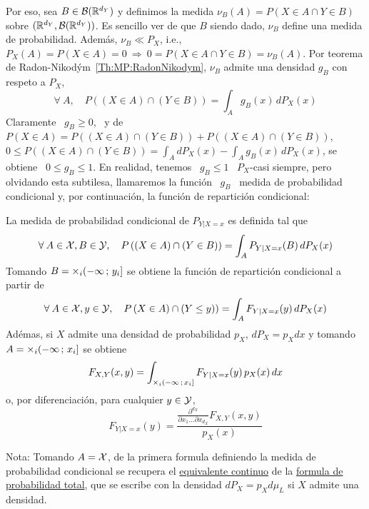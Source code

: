 {Por eso, sea $B \in \mathcal{B}(\mathbb{R}^{d_Y})$ y definimos la medida $\nu_B(A) = P(X \in A
\cap Y  \in B)$ sobre  $(\mathbb{R}^{d_Y},\mathcal{B}(\mathbb{R}^{d_Y}))$.  Es sencillo ver  de que
$B$ siendo dado, $\nu_B$ define una medida de probabilidad. Adem\'as, $\nu_B \ll
P_X$, i.e., $P_X(A) = P(X \in A) = 0  \: \Rightarrow \: 0 = P(X \in A \cap Y \in
B)  =  \nu_B(A)$.    Por  teorema  de  Radon-Nikod\'ym~\ref{Th:MP:RadonNikodym},
$\nu_B$ admite una densidad $g_B$ con respeto a $P_X$,
%
\[
\forall \: A, \quad P\left( (X \in A)  \cap (Y \in B) \right) = \int_A g_B(x) \,
dP_X(x)
\]
%
Claramente \ $g_B \ge 0$,  \ y de \ $P(X \in A) = P\left(  (X \in A) \cap (Y \in
  B) \right) + P\left(  (X \in A) \cap (Y \in B)  \right)$, \ie $\displaystyle 0
\le P\left( (X \in A) \cap (Y \in B) \right) = \int_A dP_X(x) - \int_A g_B(x) \,
dP_X(x)$, se obtiene \ $0 \le g_B \le  1$.  En realidad, tenemos \ $g_B \le 1$ \
$P_X$-casi  siempre, pero olvidando  esta subtilesa,  llamaremos la  funci\'on \
$g_B$ \ medida  de probabilidad condicional y, por  continuaci\'on, la funci\'on
de repartici\'on condicional:
%
\begin{definicion}\label{Def:MP:FRCondicional}
  La medida de probabilidad condicional de $P_{Y|X=x}$ es definida tal que
  \[
  \forall \: A \in \mathcal{X}, B \in \mathcal{Y},  \quad P\left( (X \in A) \cap (Y \in B) \right)
  = \int_A P_{Y|X=x}(B) \, dP_X(x)
  \]
  Tomando $B  = \operatorname*{\times}_i  (-\infty \, ;  \, y_i]$  se obtiene la  funci\'on de
  repartici\'on condicional a partir de
  \[
  \forall \: A \in \mathcal{X}, y \in \mathcal{Y}, \quad P\left (X \in A) \cap (Y \le y) \right) =
  \int_A F_{Y|X=x}(y) \, dP_X(x)
  \]
  Ad\'emas, si $X$ admite una densidad  de probabilidad $p_X$, $dP_X = p_X dx$ y
  tomando $A = \operatorname*{\times}_i (-\infty \, ; \, x_i]$ se obtiene
  \[
  F_{X,Y}(x,y) = \int_{\operatorname*{\times}_i (-\infty \,  ; \, x_i]} F_{Y|X=x}(y) \, p_X(x)
  \, dx
  \]
  o, por diferenciaci\'on, para cualquier $y \in \mathcal{Y}$,
  \[
  F_{Y|X=x}(y)   =  \frac{\frac{\partial^{d_X}}{\partial  x_1   \ldots  \partial
      x_{d_X}} F_{X,Y}(x,y)}{p_X(x)}
  \]
\end{definicion}
%
\noindent Nota: Tomando $A = \mathcal{X}$,  de la primera formula definiendo la medida de
probabilidad condicional  se recupera el \underline{equivalente  continuo} de la
\underline{formula de probabilidad total}, que  se escribe con la densidad $dP_X
= p_X d\mu_L$ si $X$ admite una densidad.

}
